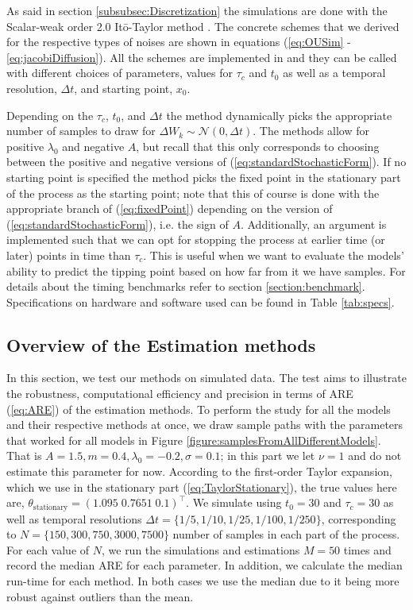 As said in section \ref{subsubsec:Discretization} the simulations are done with the Scalar-weak order 2.0 Itō-Taylor method \cite[algorithm 8.5]{Srkk2019}. The concrete schemes that we derived for the respective types of noises are shown in equations (\ref{eq:OUSim} - \ref{eq:jacobiDiffusion}). All the schemes are implemented in  and they can be called with different choices of parameters, values for $\tau_c$ and $t_0$ as well as a temporal resolution, $\Delta t$,  and starting point, $x_0$. 

Depending on the $\tau_c$, $t_0$, and $\Delta t$ the method dynamically picks the appropriate number of samples to draw for $\Delta W_k\sim\mathcal{N}\left(0,\Delta t\right)$. The methods allow for positive $\lambda_0$ and negative $A$, but recall that this only corresponds to choosing between the positive and negative versions of (\ref{eq:standardStochasticForm}). If no starting point is specified the method picks the fixed point in the stationary part of the process as the starting point; note that this of course is done with the appropriate branch of (\ref{eq:fixedPoint}) depending on the version of (\ref{eq:standardStochasticForm}), i.e. the sign of $A$. Additionally, an argument is implemented such that we can opt for stopping the process at earlier time (or later) points in time than $\tau_c$. This is useful when we want to evaluate the models' ability to predict the tipping point based on how far from it we have samples. For details about the timing benchmarks refer to section \ref{section:benchmark}. Specifications on hardware and software used can be found in Table \ref{tab:specs}. 
\subsection{Overview of the Estimation methods}
In this section, we test our methods on simulated data. The test aims to illustrate the robustness, computational efficiency and precision in terms of ARE (\ref{eq:ARE}) of the estimation methods. To perform the study for all the models and their respective methods at once, we draw sample paths with the parameters that worked for all models in Figure \ref{figure:samplesFromAllDifferentModels}. That is $A = 1.5, m = 0.4, \lambda_0 = -0.2, \sigma = 0.1$; in this part we let $\nu = 1$ and do not estimate this parameter for now. According to the first-order Taylor expansion, which we use in the stationary part (\ref{eq:TaylorStationary}), the true values here are, $\theta_{\mathrm{stationary}} = (1.095\; 0.7651\; 0.1)^\top$. We simulate using $t_0 = 30$ and $\tau_c = 30$ as well as temporal resolutions $\Delta t = \{1/5, 1/10, 1/25, 1/100, 1/250\}$, corresponding to $N = \{150, 300, 750, 3000, 7500\}$ number of samples in each part of the process. For each value of $N$, we run the simulations and estimations $M = 50$ times and record the median ARE for each parameter. In addition, we calculate the median run-time for each method. In both cases we use the median due to it being more robust against outliers than the mean.

